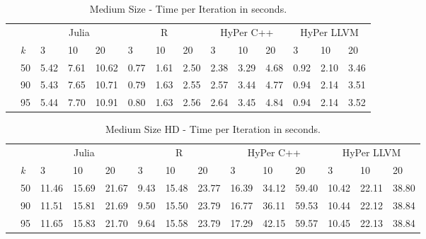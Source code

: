 \begin{table}[htsb]
  \caption[Medium Size - Time per Iteration (Competitors)]{Medium Size - Time per Iteration in seconds.}
  \label{tab:medium_all}
  \centering
  \begin{tabular}{l l l ll |l l l |l l l |l l l}
    \toprule
      && \multicolumn{3}{c}{Julia} & \multicolumn{3}{c}{R} & \multicolumn{3}{c}{HyPer C++} & \multicolumn{3}{c}{HyPer LLVM}  \\
      &\emph{k} & 3 & 10 & 20 & 3 & 10 & 20 & 3 & 10 & 20 & 3 & 10 & 20 \\
    \midrule
      \parbox[t]{2mm}{} &50  & 5.42 & 7.61 & 10.62 & 0.77 & 1.61 & 2.50 & 2.38 & 3.29 & 4.68 & 0.92 & 2.10 & 3.46 \\
      &90  & 5.43 & 7.65 & 10.71 & 0.79 & 1.63 & 2.55 & 2.57 & 3.44 & 4.77 & 0.94 & 2.14 & 3.51 \\
      &95  & 5.44 & 7.70 & 10.91 & 0.80 & 1.63 & 2.56 & 2.64 & 3.45 & 4.84 & 0.94 & 2.14 & 3.52 \\
    \bottomrule
  \end{tabular}
\end{table}

\begin{table}[htsb]
  \caption[Medium Size HD - Time per Iteration (Competitors)]{Medium Size HD - Time per Iteration in seconds.}
  \label{tab:medium_hd_all}
  \centering
  \begin{tabular}{lllll|l l l|l l l|l l l}
    \toprule
      & & \multicolumn{3}{c}{Julia} & \multicolumn{3}{c}{R} & \multicolumn{3}{c}{HyPer C++} & \multicolumn{3}{c}{HyPer LLVM}  \\
      & \emph{k} & 3 & 10 & 20 & 3 & 10 & 20 & 3 & 10 & 20 & 3 & 10 & 20 \\
    \midrule
      \parbox[t]{2mm}{} & 50  & 11.46 & 15.69 & 21.67 & 9.43 & 15.48 & 23.77 & 16.39 & 34.12 & 59.40 & 10.42 & 22.11 & 38.80 \\
     & 90  & 11.51 & 15.81 & 21.69 & 9.50 & 15.50 & 23.79 & 16.77 & 36.11 & 59.53 & 10.44 & 22.12 & 38.84 \\
     & 95  & 11.65 & 15.83 & 21.70 & 9.64 & 15.58 & 23.79 & 17.29 & 42.15 & 59.57 & 10.45 & 22.13 & 38.84 \\
    \bottomrule
  \end{tabular}
\end{table}



